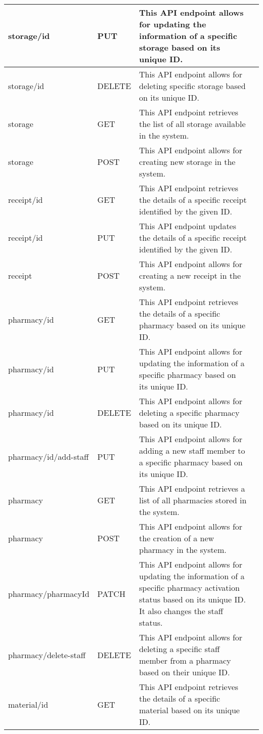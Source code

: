 \begin{longtable}{|p{}|p{} |p{}|p{}|}
\\\hline
storage/{id} &
PUT &
This API endpoint allows for updating the information of a specific storage based on its unique ID. 
\\\hline
storage/{id} &
DELETE &
This API endpoint allows for deleting specific storage based on its unique ID.
\\\hline
storage &
GET &
This API endpoint retrieves the list of all storage available in the system.
\\\hline
storage &
POST &
This API endpoint allows for creating new storage in the system. 
\\\hline
receipt/{id} &
GET &
This API endpoint retrieves the details of a specific receipt identified by the given ID.
\\\hline
receipt/{id} &
PUT &
This API endpoint updates the details of a specific receipt identified by the given ID.
\\\hline
receipt &
POST &
This API endpoint allows for creating a new receipt in the system. 
\\\hline
pharmacy/{id} &
GET &
This API endpoint retrieves the details of a specific pharmacy based on its unique ID.
\\\hline
pharmacy/{id} &
PUT &
This API endpoint allows for updating the information of a specific pharmacy based on its unique ID.
\\\hline
pharmacy/{id} &
DELETE &
This API endpoint allows for deleting a specific pharmacy based on its unique ID.
\\\hline
pharmacy/{id}/add-staff &
PUT &
This API endpoint allows for adding a new staff member to a specific pharmacy based on its unique ID. 
\\\hline
pharmacy &
GET &
This API endpoint retrieves a list of all pharmacies stored in the system.
\\\hline
pharmacy &
POST &
This API endpoint allows for the creation of a new pharmacy in the system. 
\\\hline
pharmacy/{pharmacyId} &
PATCH &
This API endpoint allows for updating the information of a specific pharmacy activation status based on its unique ID. It also changes the staff status.
\\\hline
pharmacy/delete-staff &
DELETE &
This API endpoint allows for deleting a specific staff member from a pharmacy based on their unique ID.
\\\hline
material/{id} &
GET &
This API endpoint retrieves the details of a specific material based on its unique ID.
\\\hline

\end{longtable}
